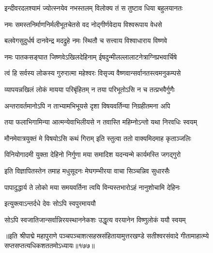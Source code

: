 \twolineshloka
{इन्दीवरदलश्यामं ज्योत्स्नयेव नभस्तलम्}
{विलोक्य तं स तुष्टाव धिया बहुलयानतः} %


\twolineshloka
{नमः समस्तनिर्माणनिर्मलीभूतचेतसे}
{वद नोद्गीर्णवेदाय विश्वरूपाय वेधसे} %

\twolineshloka
{बलवेगसुदुर्धर्ष दानवेन्द्र मदद्रुहे}
{नमः स्थितौ च सत्त्वाय विश्वाधाराय विष्णवे} %

\twolineshloka
{नमः पातकसङ्घात जिष्णवेऽखिलदेहिनाम्}
{ईषदुन्मीलल्लालाटनेत्राग्निप्रभवार्चिषे} %

\twolineshloka
{त्वं हि सर्वस्य लोकस्य गुरुरात्मा महेश्वरः}
{विसृज्य वैष्णवान्सर्वानतस्त्वमनुकम्पसे} %

\twolineshloka
{व्यापयन्नखिलं लोकं मायया परिबृंहितम्}
{न तया परिभूतोऽसि न च तत्प्रभवैर्गुणैः} %

\twolineshloka
{अन्तरावर्तमानोऽपि न ताभ्यामभिभूयसे}
{दृशा विषयवर्तिन्या निग्रहीतमना अपि} %

\twolineshloka
{तया फलाभिगामिन्या आत्मन्येवाभिलीयसे}
{न तवास्ति महिम्नोऽन्तो यथा निरवधिः स्वयम्} %

\twolineshloka
{मौनमेवात्रयुक्तं मे विषयोऽसि कथं गिराम्}
{इति स्तुत्वा ततो वाक्यमिदमाह कृताञ्जलिः} %

\twolineshloka
{विनियोगादमी युक्ता देहिनो निर्गुणा मया}
{समादिश यदन्यन्मे कार्यमस्ति जगद्गुरो} %

\twolineshloka
{इति विज्ञापितस्तेन तमाह मधुसूदनः}
{मेघगम्भीरया वाचा सिञ्चन्निव सुधारसैः} %

\twolineshloka
{पापादुद्धार्य ते लोको मया समयवर्तिना}
{त्वयि विन्यस्तभारोऽहं नानुशोचामि देहिनः} %



\onelineshloka
{इत्युक्त्वाऽन्तर्दधे देवः सोऽपि स्वपुरमाययौ} %

\twolineshloka
{सोऽपि स्वजातिजान्सर्वान्निरयस्थाननेकशः}
{उद्धृत्य वरयानेन विष्णुलोकं ययौ स्वयम्} %

॥इति श्रीपाद्मे महापुराणे पञ्चपञ्चाशत्सहस्रसंहितायामुत्तरखण्डे सतीश्वरसंवादे गीतामाहात्म्ये सप्तसप्तत्यधिकशततमोऽध्यायः॥१७७॥

\genMangalaShloka

\closesub

\ganapatyadiDhyanam
\padmaPuranam


